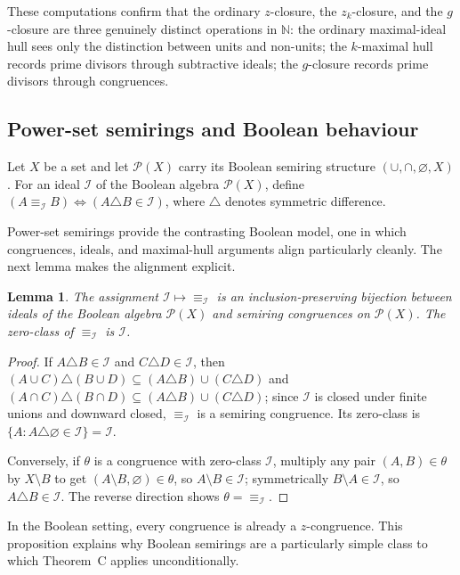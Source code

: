 \documentclass[11pt,leqno]{amsart}
\theoremstyle{plain}
\newtheorem{lemma}[theorem]{Lemma}
\theoremstyle{definition}
\theoremstyle{remark}
\numberwithin{equation}{section}
\newcommand{\N}{\mathds N}
\begin{document}
These computations confirm that the ordinary $z$-closure,
the $z_k$-closure, and the $g$-closure are three genuinely distinct
operations in $\N$:
the ordinary maximal-ideal hull sees only the distinction between
units and non-units; the $k$-maximal hull records prime divisors
through subtractive ideals; the $g$-closure records prime divisors
through congruences.

\subsection{Power-set semirings and Boolean behaviour}

Let $X$ be a set and let $\mathcal{P}(X)$ carry its Boolean semiring
structure $(\cup,\cap,\varnothing,X)$.
For an ideal $\mathcal{I}$ of the Boolean algebra $\mathcal{P}(X)$,
define $(A\equiv_{\mathcal{I}} B)\Leftrightarrow(A\triangle B\in\mathcal{I})$,
where $\triangle$ denotes symmetric difference.

Power-set semirings provide the contrasting Boolean model,
one in which congruences, ideals, and maximal-hull arguments align
particularly cleanly.
The next lemma makes the alignment explicit.

\begin{lemma}\label{lem:boolean-congruence-ideals}
The assignment $\mathcal{I}\mapsto{\equiv_{\mathcal{I}}}$ is an
inclusion-preserving bijection between ideals of the Boolean algebra
$\mathcal{P}(X)$ and semiring congruences on $\mathcal{P}(X)$.
The zero-class of $\equiv_{\mathcal{I}}$ is $\mathcal{I}$.
\end{lemma}
\begin{proof}
If $A\triangle B\in\mathcal{I}$ and $C\triangle D\in\mathcal{I}$,
then $(A\cup C)\triangle(B\cup D)\subseteq(A\triangle B)\cup(C\triangle D)$
and $(A\cap C)\triangle(B\cap D)\subseteq(A\triangle B)\cup(C\triangle D)$;
since $\mathcal{I}$ is closed under finite unions and downward closed,
$\equiv_{\mathcal{I}}$ is a semiring congruence.
Its zero-class is $\{A:A\triangle\varnothing\in\mathcal{I}\}=\mathcal{I}$.

Conversely, if $\theta$ is a congruence with zero-class $\mathcal{I}$,
multiply any pair $(A,B)\in\theta$ by $X\setminus B$ to get
$(A\setminus B,\varnothing)\in\theta$, so $A\setminus B\in\mathcal{I}$;
symmetrically $B\setminus A\in\mathcal{I}$, so $A\triangle B\in\mathcal{I}$.
The reverse direction shows $\theta=\equiv_{\mathcal{I}}$.
\end{proof}

In the Boolean setting, every congruence is already a $z$-congruence.
This proposition explains why Boolean semirings are a particularly
simple class to which Theorem~C applies unconditionally.
\end{document}
